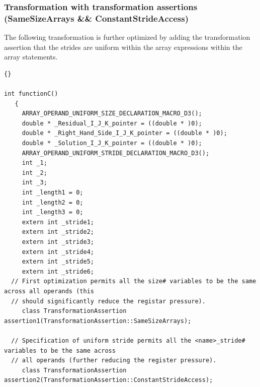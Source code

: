 \documentclass[10pt]{article}
\begin{document}

\subsubsection{Transformation with transformation assertions (SameSizeArrays \&\& ConstantStrideAccess)}

  The following transformation is further optimized by adding the transformation assertion that the strides are uniform within
the array expressions within the array statements.

\begin{lstlisting}{}

int functionC()
   { 
     ARRAY_OPERAND_UNIFORM_SIZE_DECLARATION_MACRO_D3(); 
     double * _Residual_I_J_K_pointer = ((double * )0); 
     double * _Right_Hand_Side_I_J_K_pointer = ((double * )0); 
     double * _Solution_I_J_K_pointer = ((double * )0); 
     ARRAY_OPERAND_UNIFORM_STRIDE_DECLARATION_MACRO_D3(); 
     int _1; 
     int _2; 
     int _3; 
     int _length1 = 0; 
     int _length2 = 0; 
     int _length3 = 0; 
     extern int _stride1; 
     extern int _stride2; 
     extern int _stride3; 
     extern int _stride4; 
     extern int _stride5; 
     extern int _stride6; 
  // First optimization permits all the size# variables to be the same across all operands (this
  // should significantly reduce the registar pressure).
     class TransformationAssertion assertion1(TransformationAssertion::SameSizeArrays); 

  // Specification of uniform stride permits all the <name>_stride# variables to be the same across
  // all operands (further reducing the register pressure).
     class TransformationAssertion assertion2(TransformationAssertion::ConstantStrideAccess); 


\end{lstlisting}
\end{document}
